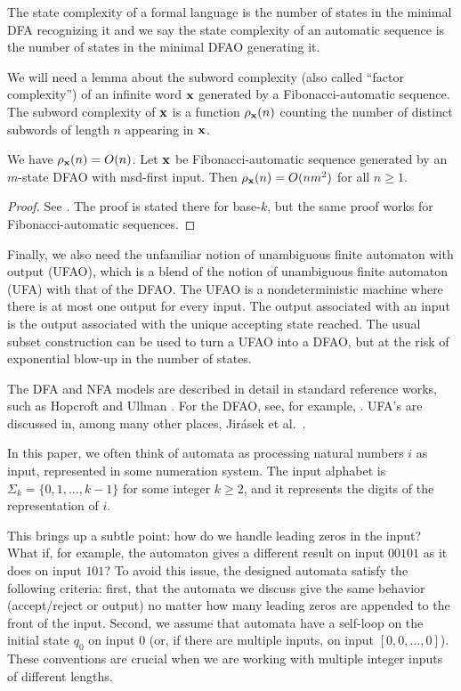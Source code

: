 \documentclass[12pt,reqno]{article}
\begin{document}
The state complexity of a formal language is the number of states in the minimal DFA recognizing it and we say the state complexity of an automatic sequence is the number of states in the minimal DFAO generating it.

We will need a lemma about the subword complexity (also called ``factor complexity'') of an infinite word $\bf x$ generated by a Fibonacci-automatic sequence.
The subword complexity of $\bf x$ is a function
$\rho_{\bf x} (n)$ counting the number of distinct subwords of length $n$ appearing in $\bf x$.
\begin{lemma}
We have $\rho_{\bf x}(n) = O(n)$.
\label{lemma:subword-sc}
Let ${\bf x}$ be  Fibonacci-automatic sequence generated by an $m$-state DFAO with msd-first input.
Then $\rho_{\bf x} (n) = O(n m^2)$ for all $n \geq 1$. 
\end{lemma}

\begin{proof}
See \cite[Theorem 10.3.1]{allouche_automatic_2003}. The proof is stated there for base-$k$, but the same proof works for Fibonacci-automatic sequences.
\end{proof}

Finally, we also need the unfamiliar notion of unambiguous finite automaton with output (UFAO),
which is a blend of the notion of unambiguous
finite automaton (UFA) with that of the DFAO.  The UFAO is a nondeterministic machine where there is at most one output for every input.  The output associated with an input is the output associated with the unique accepting state reached.  The usual subset construction can be used to turn a UFAO into a DFAO, but at the risk of exponential blow-up in the number of states.

The DFA and NFA models  are described in detail in standard reference
works, such as Hopcroft and Ullman \cite[Chapter 2 and Chapter 3]{hopcroft_introduction_1979}.  For the DFAO, see, for example, \cite[Chapter 4]{allouche_automatic_2003}.
UFA's are discussed in, among many other places,
Jir{\'a}sek et al.~\cite{jozef_jirasek_jr_operations_2018}.

In this paper, we often think of automata as processing natural numbers $i$
as input, represented in some numeration system.
The input alphabet is $\Sigma_k = \{ 0,1,\ldots, k-1 \}$
for some integer $k \geq 2$, and it represents the digits
of the representation of $i
$.

This brings up a subtle point:  how do we handle leading
zeros in the input?  What if, for example, the
automaton gives a different result on input $00101$ as it does on input
$101$?  To avoid this issue, the designed automata satisfy the following criteria:
first, that 
the automata we discuss give the same behavior (accept/reject or output)
no matter how many leading zeros are appended to the front of the input.
Second, we assume that automata have a self-loop on the initial
state $q_0$ on input $0$ (or, if there are multiple inputs, on input
$[0,0,\ldots,0]$).  These conventions are crucial when we are working
with multiple integer inputs of different lengths.
\end{document}
